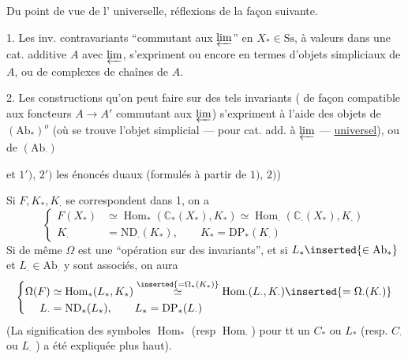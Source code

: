 Du point de vue de l' universelle,
réflexions de la façon suivante.

1. Les inv. contravariants ``commutant aux
$\varprojlim$'' en $X_*\in\mathrm{Ss}$, à valeurs dans une
cat. additive $A$ avec $\varprojlim$, s'expriment
ou encore en termes d'objets simpliciaux
de $A$, ou de complexes de chaînes de $A$.

2. Les constructions qu'on peut faire sur des
tels invariants ( de façon compatible aux
foncteurs $A\longrightarrow A'$ commutant aux $\varprojlim$)
s'expriment à l'aide des objets
de $(\mathrm{Ab}_*)^o$ (où se trouve l'objet
simplicial --- pour cat. add. à $\varprojlim$ ---
\uline{universel}), ou de $(\mathrm{Ab}_\cdot)$

et $1')$, $2')$ les énoncés duaux (formulés
à partir de $1)$, $2)$)

Si $F,K_*,K_\cdot$ se correspondent dans
1, on a
\[
\left\{\begin{aligned}
F(X_*)&\simeq\operatorname{Hom}_*(\mathbb C_*(X_*),K_*)\simeq
\operatorname{Hom}_\cdot(\mathbb C_\cdot(X_*),K_\cdot)\\
K_\cdot&=\mathrm{ND}_\cdot(K_*),\qquad K_*=\mathrm{DP}_*(K_\cdot)
\end{aligned}\right.
\]
Si de même $\Omega$ est une ``opération sur des
invariants'', et si $L_*\inserted{\in\mathrm{Ab}_*}$ et $L_\cdot\in\mathrm{Ab}_\cdot$ y
sont associés, on aura
\[
\left\{\begin{aligned}
\Omega(F)&\simeq\operatorname{Hom}_*(L_*,K_*)\overset{\inserted{=\Omega_*(K_*)}}\simeq
\operatorname{Hom}_\cdot(L_\cdot,K_\cdot)\inserted{=\Omega_\cdot(K_\cdot)}\\
L_\cdot&=\mathrm{ND}_*(L_*),\qquad L_*=\mathrm{DP}_*(L_\cdot)
\end{aligned}\right.
\]
(La signification des symboles $\operatorname{Hom}_*$ (resp $\operatorname{Hom}_\cdot$)
pour tt un $C_*$ ou $L_*$  (resp. $C_\cdot$ ou $L_\cdot$ )
a été expliquée plus haut).

